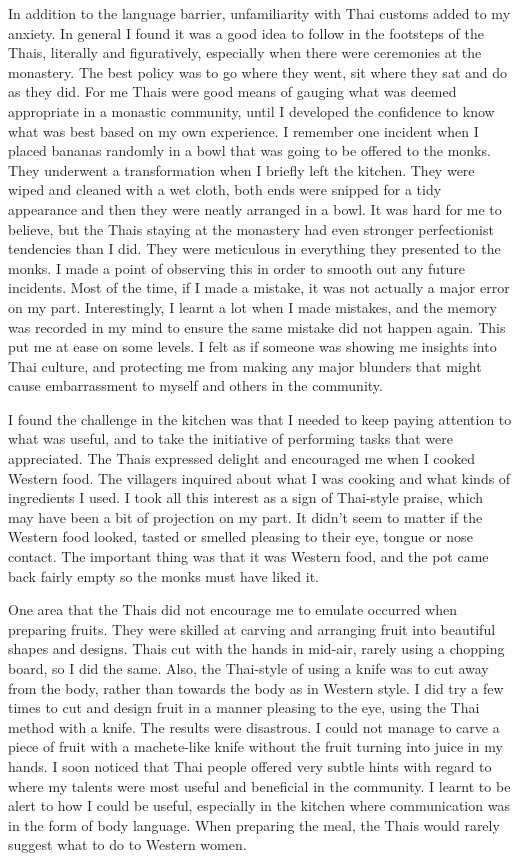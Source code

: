 In addition to the language barrier, unfamiliarity with Thai customs
added to my anxiety. In general I found it was a good idea to follow in
the footsteps of the Thais, literally and figuratively, especially when
there were ceremonies at the monastery. The best policy was to go where
they went, sit where they sat and do as they did. For me Thais were good
means of gauging what was deemed appropriate in a monastic community, 
until I developed the confidence to know what was best based on my own
experience. I remember one incident when I placed bananas randomly in a
bowl that was going to be offered to the monks. They underwent a
transformation when I briefly left the kitchen. They were wiped and
cleaned with a wet cloth, both ends were snipped for a tidy appearance
and then they were neatly arranged in a bowl. It was hard for me to
believe, but the Thais staying at the monastery had even stronger
perfectionist tendencies than I did. They were meticulous in everything
they presented to the monks. I made a point of observing this in order
to smooth out any future incidents. Most of the time, if I made a
mistake, it was not actually a major error on my part. Interestingly, I
learnt a lot when I made mistakes, and the memory was recorded in my
mind to ensure the same mistake did not happen again. This put me at
ease on some levels. I felt as if someone was showing me insights into
Thai culture, and protecting me from making any major blunders that
might cause embarrassment to myself and others in the community. 

I found the challenge in the kitchen was that I needed to keep paying
attention to what was useful, and to take the initiative of performing
tasks that were appreciated. The Thais expressed delight and encouraged
me when I cooked Western food. The villagers inquired about what I was
cooking and what kinds of ingredients I used. I took all this interest
as a sign of Thai-style praise, which may have been a bit of projection
on my part. It didn't seem to matter if the Western food looked, tasted
or smelled pleasing to their eye, tongue or nose contact. The important
thing was that it was Western food, and the pot came back fairly empty
so the monks must have liked it. 

One area that the Thais did not encourage me to emulate occurred when
preparing fruits. They were skilled at carving and arranging fruit into
beautiful shapes and designs. Thais cut with the hands in mid-air, 
rarely using a chopping board, so I did the same. Also, the Thai-style
of using a knife was to cut away from the body, rather than towards the
body as in Western style. I did try a few times to cut and design fruit
in a manner pleasing to the eye, using the Thai method with a knife. The
results were disastrous. I could not manage to carve a piece of fruit
with a machete-like knife without the fruit turning into juice in my
hands. I soon noticed that Thai people offered very subtle hints with
regard to where my talents were most useful and beneficial in the
community. I learnt to be alert to how I could be useful, especially in
the kitchen where communication was in the form of body language. When
preparing the meal, the Thais would rarely suggest what to do to Western
women. 

